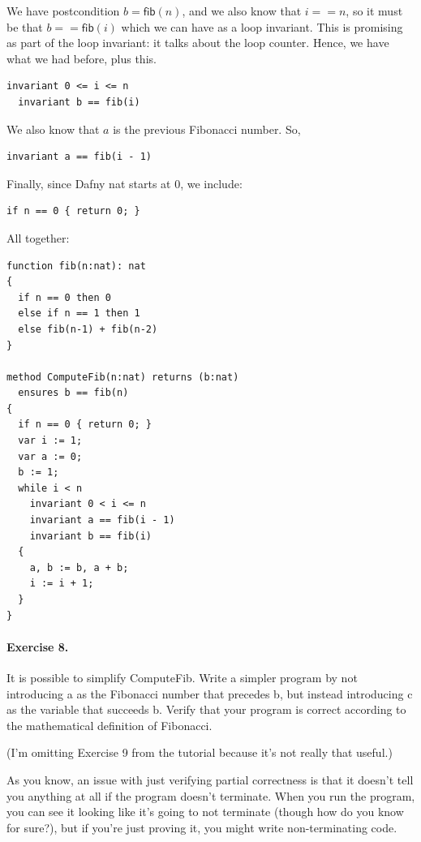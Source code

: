 \documentclass[11pt]{article}
\begin{document}
We have postcondition $b = \mathsf{fib}(n)$, and we also know
that $i == n$, so it must be that $b == \mathsf{fib}(i)$ which we can have as a loop invariant. This
is promising as part of the loop invariant: it talks about the loop counter. Hence, we have what we had before,
plus this.
\begin{lstlisting}[language=dafny]
  invariant 0 <= i <= n
  invariant b == fib(i)
\end{lstlisting}
We also know that $a$ is the previous Fibonacci number. So,
\begin{lstlisting}[language=dafny]
  invariant a == fib(i - 1)
\end{lstlisting}
Finally, since Dafny \textsf{nat} starts at 0, we include:
\begin{lstlisting}[language=dafny]
  if n == 0 { return 0; }
\end{lstlisting}
All together:
\begin{lstlisting}[language=dafny]
function fib(n:nat): nat
{
  if n == 0 then 0
  else if n == 1 then 1
  else fib(n-1) + fib(n-2)
}

method ComputeFib(n:nat) returns (b:nat)
  ensures b == fib(n)
{
  if n == 0 { return 0; }
  var i := 1;
  var a := 0;
  b := 1;
  while i < n
    invariant 0 < i <= n
    invariant a == fib(i - 1)
    invariant b == fib(i)
  {
    a, b := b, a + b;
    i := i + 1;
  }
}
\end{lstlisting}


\paragraph{Exercise 8.} It is possible to simplify \textsf{ComputeFib}.
Write a simpler program by not introducing \textsf{a} as the Fibonacci number
that precedes \textsf{b}, but instead introducing \textsf{c} as the variable that
succeeds \textsf{b}. Verify that your program is correct according to the mathematical
definition of Fibonacci.

(I'm omitting Exercise 9 from the tutorial because it's not really that useful.)

As you know, an issue with just verifying partial correctness is that it doesn't tell you
anything at all if the program doesn't terminate. When you run the program, you can see it looking like it's going to not
terminate (though how do you know for sure?), but if you're just proving it, you might write non-terminating code.
\end{document}
